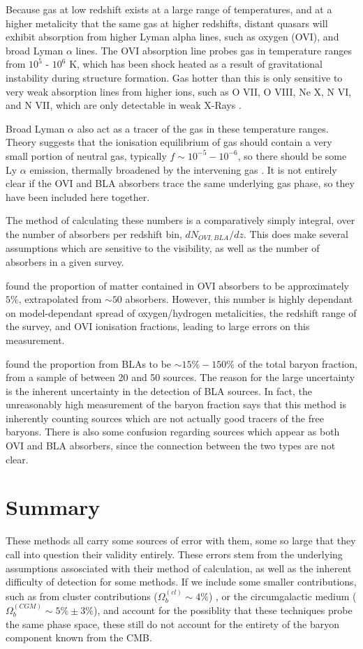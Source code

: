 Because gas at low redshift exists at a large range of temperatures, and at a higher metalicity that the same gas at higher redshifts, distant quasars will exhibit absorption from higher Lyman alpha lines, such as oxygen (OVI), and broad Lyman $\alpha$ lines. The OVI absorption line probes gas in temperature ranges from $10^5$ - $10^6$ K, which has been shock heated as a result of gravitational instability during structure formation. Gas hotter than this is only sensitive to very weak absorption lines from higher ions, such as O VII, O VIII, Ne X, N VI, and N VII, which are only detectable in weak X-Rays \citep{2005ApJ...624..555D}. 
\par Broad Lyman $\alpha$ also act as a tracer of the gas in these temperature ranges. Theory suggests that the ionisation equilibrium of gas should contain a very small portion of neutral gas, typically $f \sim 10^{-5} - 10^{-6}$, so there should be some Ly $\alpha$ emission, thermally broadened by the intervening gas \citep{2006A&A...445..827R}. It is not entirely clear if the OVI and BLA absorbers trace the same underlying gas phase, so they have been included here together. 
\par The method of calculating these numbers is a comparatively simply integral, over the number of absorbers per redshift bin, $dN_{OVI,BLA}/dz$. This does make several assumptions which are sensitive to the visibility, as well as the number of absorbers in a given survey. \par \cite{2005ApJ...624..555D} found the proportion of matter contained in OVI absorbers to be approximately $5\%$, extrapolated from $\sim 50$ absorbers. However, this number is highly dependant on model-dependant spread of oxygen/hydrogen metalicities, the redshift range of the survey, and OVI ionisation fractions, leading to large errors on this measurement. 
\par \cite{2006A&A...445..827R} found the proportion from BLAs to be $\sim 15 \% - 150 \%$ of the total baryon fraction, from a sample of between 20 and 50 sources. The reason for the large uncertainty is the inherent uncertainty in the detection of BLA sources. In fact, the unreasonably high measurement of the baryon fraction says that this method is inherently counting sources which are not actually good tracers of the free baryons. There is also some confusion regarding sources which appear as both OVI and BLA absorbers, since the connection between the two types are not clear. 

\section{Summary}
These methods all carry some sources of error with them, some so large that they call into question their validity entirely. These errors stem from the underlying assumptions assosciated with their method of calculation, as well as the inherent difficulty of detection for some methods. If we include some smaller contributions, such as from cluster contributions ($\Omega_b^{(cl)} \sim 4 \%$)\citep{2004ApJ...616..643F} , or the circumgalactic medium ($\Omega_b^{(CGM)} \sim 5 \% \pm 3\%$), and account for the possiblity that these techniques probe the same phase space, these still do not account for the entirety of the baryon component known from the CMB. 
